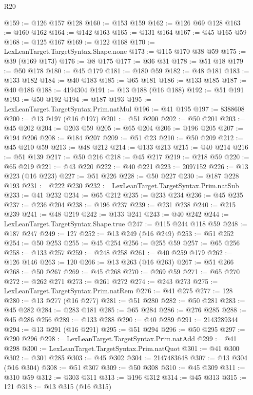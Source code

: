 \begin{lexlean}{R20}
\begin{coremodule}
@159 := @126 @157 @128
@160 := @153 @159
@162 := @126 @69 @128
@163 := @160 @162
@164 := @142 @163
@165 := @131 @164
@167 := @45 @165 @59
@168 := @125 @167
@169 := @122 @168
@170 := LexLeanTarget.TargetSyntax.Shape.none
@173 := @115 @170 @38 @59
@175 := @39 (@169 @173)
@176 := @8 @175
@177 := @36 @31
@178 := @51 @18
@179 := @50 @178
@180 := @45 @179
@181 := @180 @59
@182 := @48 @181
@183 := @133 @182
@184 := @40 @183
@185 := @65 @181
@186 := @133 @185
@187 := @40 @186
@188 := 4194304
@191 := @13 @188 (@16 @188)
@192 := @51 @191
@193 := @50 @192
@194 := @187 @193
@195 := LexLeanTarget.TargetSyntax.Prim.natMul
@196 := @41 @195
@197 := 8388608
@200 := @13 @197 (@16 @197)
@201 := @51 @200
@202 := @50 @201
@203 := @45 @202
@204 := @203 @59
@205 := @65 @204
@206 := @196 @205
@207 := @194 @206
@208 := @184 @207
@209 := @51 @23
@210 := @50 @209
@212 := @45 @210 @59
@213 := @48 @212
@214 := @133 @213
@215 := @40 @214
@216 := @51 @139
@217 := @50 @216
@218 := @45 @217
@219 := @218 @59
@220 := @65 @219
@221 := @43 @220
@222 := @40 @221
@223 := 2097152
@226 := @13 @223 (@16 @223)
@227 := @51 @226
@228 := @50 @227
@230 := @187 @228 @193
@231 := @222 @230
@232 := LexLeanTarget.TargetSyntax.Prim.natSub
@233 := @41 @232
@234 := @65 @212
@235 := @233 @234
@236 := @45 @235
@237 := @236 @204
@238 := @196 @237
@239 := @231 @238
@240 := @215 @239
@241 := @48 @219
@242 := @133 @241
@243 := @40 @242
@244 := LexLeanTarget.TargetSyntax.Shape.true
@247 := @115 @244 @118 @59
@248 := @187 @247
@249 := 127
@252 := @13 @249 (@16 @249)
@253 := @51 @252
@254 := @50 @253
@255 := @45 @254
@256 := @255 @59
@257 := @65 @256
@258 := @133 @257
@259 := @248 @258
@261 := @40 @259 @179
@262 := @126 @146
@263 := 120
@266 := @13 @263 (@16 @263)
@267 := @51 @266
@268 := @50 @267
@269 := @45 @268
@270 := @269 @59
@271 := @65 @270
@272 := @262 @271
@273 := @261 @272
@274 := @243 @273
@275 := LexLeanTarget.TargetSyntax.Prim.natRem
@276 := @41 @275
@277 := 128
@280 := @13 @277 (@16 @277)
@281 := @51 @280
@282 := @50 @281
@283 := @45 @282
@284 := @283 @181
@285 := @65 @284
@286 := @276 @285
@288 := @45 @286 @256
@289 := @133 @288
@290 := @40 @289
@291 := 2143289344
@294 := @13 @291 (@16 @291)
@295 := @51 @294
@296 := @50 @295
@297 := @290 @296
@298 := LexLeanTarget.TargetSyntax.Prim.natAdd
@299 := @41 @298
@300 := LexLeanTarget.TargetSyntax.Prim.natQuot
@301 := @41 @300
@302 := @301 @285
@303 := @45 @302
@304 := 2147483648
@307 := @13 @304 (@16 @304)
@308 := @51 @307
@309 := @50 @308
@310 := @45 @309
@311 := @310 @59
@312 := @303 @311
@313 := @196 @312
@314 := @45 @313
@315 := 121
@318 := @13 @315 (@16 @315)

\end{coremodule}
\end{lexlean}
